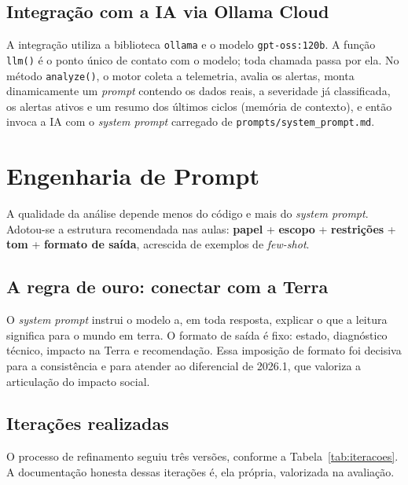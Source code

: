 \documentclass[12pt,a4paper]{article}
\begin{document}
\subsection{Integração com a IA via Ollama Cloud}

A integração utiliza a biblioteca \texttt{ollama} e o modelo \texttt{gpt-oss:120b}. A função \texttt{llm()} é o ponto único de contato com o modelo; toda chamada passa por ela. No método \texttt{analyze()}, o motor coleta a telemetria, avalia os alertas, monta dinamicamente um \textit{prompt} contendo os dados reais, a severidade já classificada, os alertas ativos e um resumo dos últimos ciclos (memória de contexto), e então invoca a IA com o \textit{system prompt} carregado de \texttt{prompts/system\_prompt.md}.

\section{Engenharia de Prompt}

A qualidade da análise depende menos do código e mais do \textit{system prompt}. Adotou-se a estrutura recomendada nas aulas: \textbf{papel} + \textbf{escopo} + \textbf{restrições} + \textbf{tom} + \textbf{formato de saída}, acrescida de exemplos de \textit{few-shot}.

\subsection{A regra de ouro: conectar com a Terra}

O \textit{system prompt} instrui o modelo a, em toda resposta, explicar o que a leitura significa para o mundo em terra. O formato de saída é fixo: estado, diagnóstico técnico, impacto na Terra e recomendação. Essa imposição de formato foi decisiva para a consistência e para atender ao diferencial de 2026.1, que valoriza a articulação do impacto social.

\subsection{Iterações realizadas}

O processo de refinamento seguiu três versões, conforme a Tabela~\ref{tab:iteracoes}. A documentação honesta dessas iterações é, ela própria, valorizada na avaliação.
\end{document}
